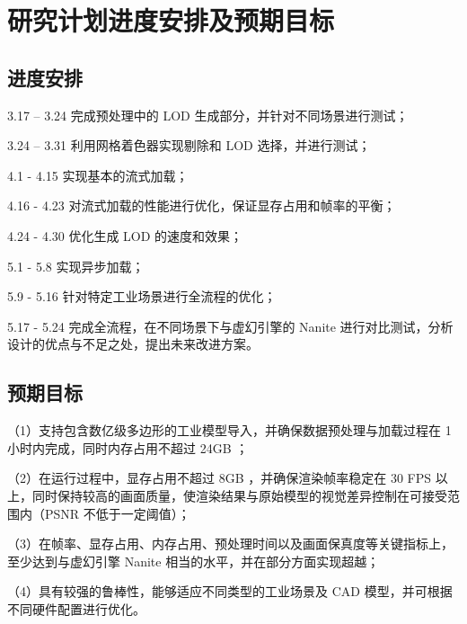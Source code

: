 \section{研究计划进度安排及预期目标}

\subsection{进度安排}

3.17 – 3.24 完成预处理中的 LOD 生成部分，并针对不同场景进行测试；

3.24 – 3.31 利用网格着色器实现剔除和 LOD 选择，并进行测试；

4.1  -  4.15 实现基本的流式加载；

4.16 -  4.23 对流式加载的性能进行优化，保证显存占用和帧率的平衡；

4.24 -  4.30 优化生成 LOD 的速度和效果；

5.1  -  5.8  实现异步加载；

5.9  -  5.16 针对特定工业场景进行全流程的优化；

5.17 -  5.24 完成全流程，在不同场景下与虚幻引擎的 Nanite 进行对比测试，分析设计的优点与不足之处，提出未来改进方案。

\subsection{预期目标}

（1）支持包含数亿级多边形的工业模型导入，并确保数据预处理与加载过程在 1 小时内完成，同时内存占用不超过 24GB ；

（2）在运行过程中，显存占用不超过 8GB ，并确保渲染帧率稳定在 30 FPS 以上，同时保持较高的画面质量，使渲染结果与原始模型的视觉差异控制在可接受范围内（PSNR 不低于一定阈值）；

（3）在帧率、显存占用、内存占用、预处理时间以及画面保真度等关键指标上，至少达到与虚幻引擎 Nanite 相当的水平，并在部分方面实现超越；

（4）具有较强的鲁棒性，能够适应不同类型的工业场景及 CAD 模型，并可根据不同硬件配置进行优化。
